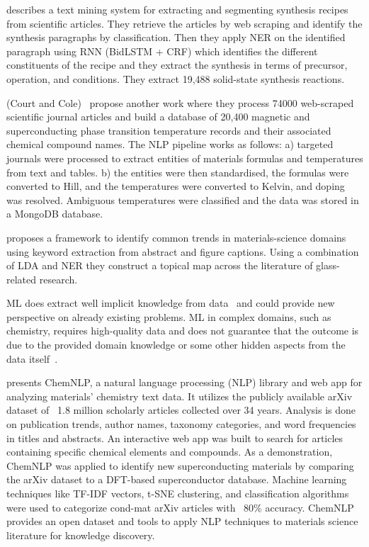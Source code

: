 \cite{kononova2019text} describes a text mining system for extracting and segmenting synthesis recipes from scientific articles. 
They retrieve the articles by web scraping and identify the synthesis paragraphs by classification. Then they apply NER on the identified paragraph using RNN (BidLSTM + CRF) which identifies the different constituents of the recipe and they extract the synthesis in terms of precursor, operation, and conditions. They extract 19,488 solid-state synthesis reactions.

(Court and Cole)~\cite{court2020magnetic} propose another work where they process 74000 web-scraped scientific journal articles and build a database of 20,400 magnetic and superconducting phase transition temperature records and their associated chemical compound names.
The NLP pipeline works as follows: a) targeted journals were processed to extract entities of materials formulas and temperatures from text and tables. b) the entities were then standardised, the formulas were converted to Hill, and the temperatures were converted to Kelvin, and doping was resolved. Ambiguous temperatures were classified and the data was stored in a MongoDB database. 


\cite{venugopal2021looking} proposes a framework to identify common trends in materials-science domains using keyword extraction from abstract and figure captions. Using a combination of LDA and NER they construct a topical map across the literature of glass-related research. 


ML does extract well implicit knowledge from data~\cite{keith2021combining} and could provide new perspective on already existing problems. 
ML in complex domains, such as chemistry, requires high-quality data and does not guarantee that the outcome is due to the provided domain knowledge or some other hidden aspects from the data itself~\cite{keith2021combining}.

\cite{choudhary2023chemnlp} presents ChemNLP, a natural language processing (NLP) library and web app for analyzing materials' chemistry text data.
It utilizes the publicly available arXiv dataset of ~1.8 million scholarly articles collected over 34 years.
Analysis is done on publication trends, author names, taxonomy categories, and word frequencies in titles and abstracts.
An interactive web app was built to search for articles containing specific chemical elements and compounds.
As a demonstration, ChemNLP was applied to identify new superconducting materials by comparing the arXiv dataset to a DFT-based superconductor database.
Machine learning techniques like TF-IDF vectors, t-SNE clustering, and classification algorithms were used to categorize cond-mat arXiv articles with ~80\% accuracy.
ChemNLP provides an open dataset and tools to apply NLP techniques to materials science literature for knowledge discovery.

